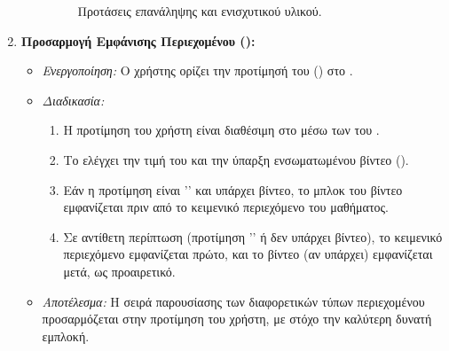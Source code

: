 \begin{enumerate}[leftmargin=*, label=\arabic*., wide, labelwidth=!, labelindent=0pt, itemsep=1ex]
\begin{itemize}[leftmargin=1.5em, noitemsep]
\begin{figure}[h!]
              \caption{Προτάσεις επανάληψης και ενισχυτικού υλικού.}
              \label{fig:post_course_resources_placeholder}
            \end{figure}
        \end{itemize}

    \item \textbf{Προσαρμογή Εμφάνισης Περιεχομένου ():}
        \begin{itemize}[leftmargin=1.5em, noitemsep]
            \item \textit{Ενεργοποίηση:} Ο χρήστης ορίζει την προτίμησή του (\texttt{}) στο .
            \item \textit{Διαδικασία:}
            \begin{enumerate}[leftmargin=1.5em, label=\alph*), noitemsep]
                \item Η προτίμηση του χρήστη είναι διαθέσιμη στο  μέσω των  του .
                \item Το  ελέγχει την τιμή του \texttt{} και την ύπαρξη ενσωματωμένου βίντεο (\texttt{}).
                \item Εάν η προτίμηση είναι '' και υπάρχει βίντεο, το μπλοκ του βίντεο εμφανίζεται πριν από το κειμενικό περιεχόμενο του μαθήματος.
                \item Σε αντίθετη περίπτωση (προτίμηση '' ή δεν υπάρχει βίντεο), το κειμενικό περιεχόμενο εμφανίζεται πρώτο, και το βίντεο (αν υπάρχει) εμφανίζεται μετά, ως προαιρετικό.
            \end{enumerate}
            \item \textit{Αποτέλεσμα:} Η σειρά παρουσίασης των διαφορετικών τύπων περιεχομένου προσαρμόζεται στην προτίμηση του χρήστη, με στόχο την καλύτερη δυνατή εμπλοκή.
            \begin{figure}[h!]
              \centering

\end{figure}
\end{itemize}
\end{enumerate}

